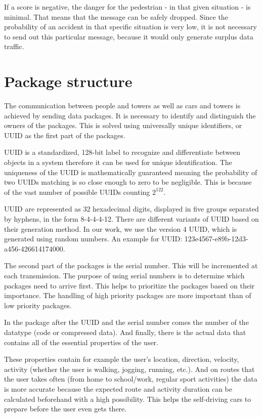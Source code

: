 \documentclass[conference]{IEEEtran}
\begin{document}
If a score is negative, the danger for the pedestrian - in that given situation - is minimal. That means that the message can be safely dropped. Since the probability of an accident in that specific situation is very low, it is not necessary to send out this particular message, because it would only generate surplus data traffic.

\section{Package structure}

The communication between people and towers as well as cars and towers is achieved by sending data packages. It is necessary to identify and distinguish the owners of the packages. This is solved using universally unique identifiers, or UUID as the first part of the packages.

UUID is a standardized, 128-bit label to recognize and differentiate between objects in a system therefore it can be used for unique identification. The uniqueness of the UUID is mathematically guaranteed meaning the probability of two UUIDs matching is so close enough to zero to be negligible. This is because of the vast number of possible UUIDs counting $2^{122}$.

UUID are represented as 32 hexadecimal digits, displayed in five groups separated by hyphens, in the form 8-4-4-4-12. There are different variants of UUID based on their generation method. In our work, we use the version 4 UUID, which is generated using random numbers. An example for UUID: 123e4567-e89b-12d3-a456-426614174000.

The second part of the packages is the serial number. This will be incremented at each transmission. The purpose of using serial numbers is to determine which packages need to arrive first. This helps to prioritize the packages based on their importance. The handling of high priority packages are more important than of low priority packages.

In the package after the UUID and the serial number comes the number of the datatype (code or compressed data). And finally, there is the actual data that contains all of the essential properties of the user.

These properties contain for example the user’s location, direction, velocity, activity (whether the user is walking, jogging, running, etc.). And on routes that the user takes often (from home to school/work, regular sport activities) the data is more accurate because the expected route and activity duration can be calculated beforehand with a high possibility. This helps the self-driving cars to prepare before the user even gets there.
\end{document}
